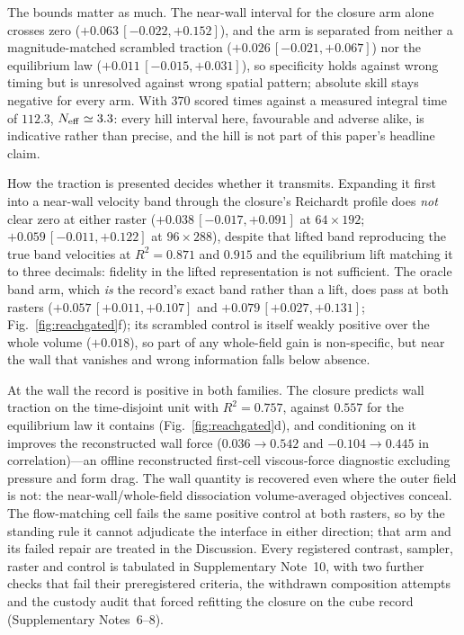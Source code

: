 The bounds matter as much. The near-wall interval for the closure arm alone crosses zero
($+0.063\,[-0.022,+0.152]$), and the arm is separated from neither a magnitude-matched scrambled
traction ($+0.026\,[-0.021,+0.067]$) nor the equilibrium law ($+0.011\,[-0.015,+0.031]$), so
specificity holds against wrong timing but is unresolved against wrong spatial pattern; absolute
skill stays negative for every arm. With $370$ scored times against a measured integral time of
$112.3$, $N_{\rm eff}\simeq3.3$: every hill interval here, favourable and adverse alike, is
indicative rather than precise, and the hill is not part of this paper's headline claim.

How the traction is presented decides whether it transmits. Expanding it first into a near-wall
velocity band through the closure's Reichardt profile does \emph{not} clear zero at either raster
($+0.038\,[-0.017,+0.091]$ at $64\times192$; $+0.059\,[-0.011,+0.122]$ at $96\times288$), despite
that lifted band reproducing the true band velocities at $R^2=0.871$ and $0.915$ and the
equilibrium lift matching it to three decimals: fidelity in the lifted representation is not
sufficient. The oracle band arm, which \emph{is} the record's exact band rather than a lift, does
pass at both rasters ($+0.057\,[+0.011,+0.107]$ and $+0.079\,[+0.027,+0.131]$;
Fig.~\ref{fig:reachgated}f); its scrambled control is itself weakly positive over the whole
volume ($+0.018$), so part of any whole-field gain is non-specific, but near the wall that
vanishes and wrong information falls below absence.

At the wall the record is positive in both families. The closure predicts wall traction on the
time-disjoint unit with $R^2=0.757$, against $0.557$ for the equilibrium law it contains
(Fig.~\ref{fig:reachgated}d), and conditioning on it improves the reconstructed wall force
($0.036\to0.542$ and $-0.104\to0.445$ in correlation)---an offline reconstructed first-cell
viscous-force diagnostic excluding pressure and form drag. The wall quantity is recovered even
where the outer field is not: the near-wall/whole-field dissociation volume-averaged objectives
conceal. The flow-matching cell fails the same positive
control at both rasters, so by the standing rule it cannot adjudicate the interface in either
direction; that arm and its failed repair are treated in the
Discussion. Every registered contrast, sampler, raster and control is
tabulated in Supplementary Note~10, with two further checks that fail their preregistered
criteria, the withdrawn composition attempts and the custody audit that forced refitting the
closure on the cube record (Supplementary Notes~6--8).


